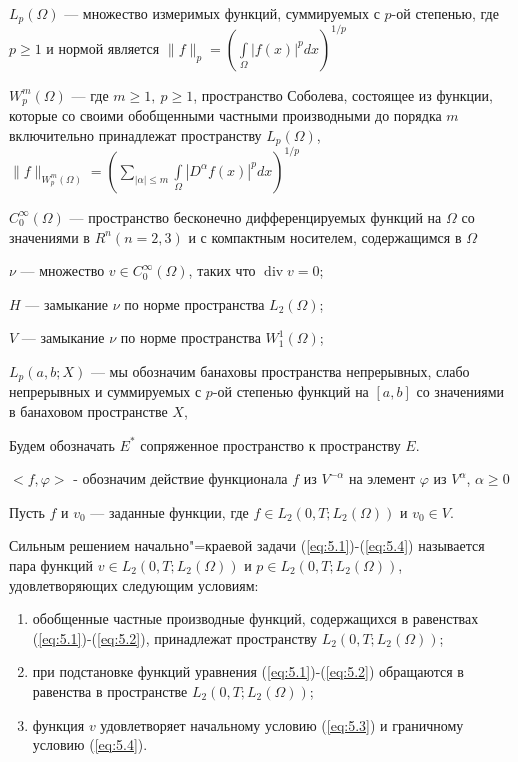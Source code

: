 $L_p(\Omega)$ --- множество измеримых функций, суммируемых с $p$-ой степенью, где $p\geqslant 1$
и нормой является $\|f\|_p=(\int\limits_\Omega |f(x)|^pdx)^{1/p}$

$W_p^m(\Omega)$ --- где $m\geqslant 1, \ p\geqslant 1$, пространство Соболева, состоящее из
функции, которые со своими обобщенными частными производными до порядка $m$ включительно принадлежат пространству $L_p(\Omega)$,\\
$\|f\|_{W_p^m(\Omega)}=\left(\sum_{|\alpha|\leqslant m} \int\limits_\Omega |D^{\alpha}f(x)|^pdx\right)^{1/p}$

$C_0^{\infty}(\Omega)$ --- пространство бесконечно дифференцируемых функций на $\Omega$ со значениями в $R^n(n=2, 3)$ и с компактным носителем,
содержащимся в $\Omega$

$\nu$ --- множество $v\in C_0^{\infty}(\Omega)$, таких что $\operatorname{div}v=0$;

$H$ --- замыкание $\nu$ по норме пространства $L_2(\Omega)$;

$V$ --- замыкание $\nu$ по норме пространства $W_1^1(\Omega)$;

$L_p(a, b;X)$ --- мы обозначим банаховы пространства непрерывных, слабо непрерывных и суммируемых с $p$-ой степенью функций на $[a, b]$ со значениями в
банаховом пространстве $X$,

Будем обозначать $E^*$ сопряженное пространство к пространству $E$.

$<f,\varphi>$ - обозначим действие функционала $f$ из $V^{-\alpha}$ на элемент $\varphi$ из $V^{\alpha}$, $\alpha\geqslant 0$

Пусть $f$ и $v_0$ --- заданные функции,
где $f\in L_2(0, T; L_2(\Omega))$ и $v_0\in V$.

\begin{definition}
    Сильным решением начально"=краевой задачи (\ref{eq:5.1})-(\ref{eq:5.4}) называется пара функций $v\in L_2(0, T; L_2(\Omega))$ и
    $p\in L_2(0, T; L_2(\Omega))$, удовлетворяющих следующим условиям:
\end{definition}

\begin{enumerate} 
    \item обобщенные частные производные функций, содержащихся в равенствах (\ref{eq:5.1})-(\ref{eq:5.2}), принадлежат пространству $L_2(0, T; L_2(\Omega))$;
    \item при подстановке функций уравнения (\ref{eq:5.1})-(\ref{eq:5.2}) обращаются в равенства в пространстве $L_2(0, T; L_2(\Omega))$;
    \item функция $v$ удовлетворяет начальному условию (\ref{eq:5.3}) и граничному условию (\ref{eq:5.4}).
\end{enumerate}

